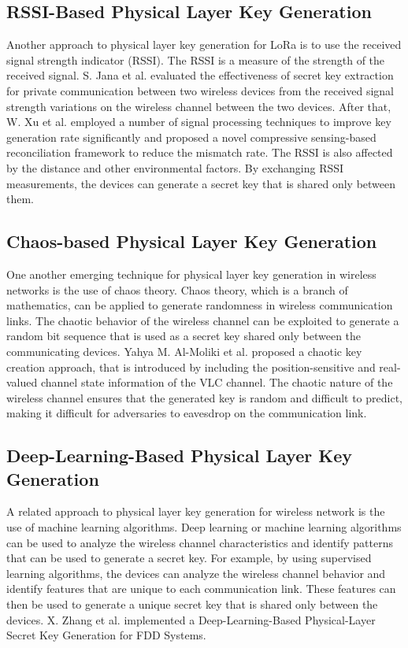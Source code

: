 \subsection{RSSI-Based Physical Layer Key Generation}
Another approach to physical layer key generation for LoRa is to use the received signal strength indicator (RSSI). The RSSI is a measure of the strength of the received signal. S. Jana et al. evaluated the effectiveness of secret key extraction for private communication between two wireless devices from the received signal strength variations on the wireless channel between the two devices\cite{10.1145/1614320.1614356}. After that, W. Xu et al. employed a number of signal processing techniques to improve key generation rate significantly and proposed a novel compressive sensing-based reconciliation framework to reduce the mismatch rate\cite{8580375}. The RSSI is also affected by the distance and other environmental factors. By exchanging RSSI measurements, the devices can generate a secret key that is shared only between them.
\subsection{Chaos-based Physical Layer Key Generation}
One another emerging technique for physical layer key generation in wireless networks is the use of chaos theory. Chaos theory, which is a branch of mathematics, can be applied to generate randomness in wireless communication links. The chaotic behavior of the wireless channel can be exploited to generate a random bit sequence that is used as a secret key shared only between the communicating devices. Yahya M. Al-Moliki et al. proposed a chaotic key creation approach, that is introduced by including the position-sensitive and real-valued channel state information of the VLC channel\cite{https://doi.org/10.1049/iet-opt.2018.5072}. The chaotic nature of the wireless channel ensures that the generated key is random and difficult to predict, making it difficult for adversaries to eavesdrop on the communication link.
\subsection{Deep-Learning-Based Physical Layer Key Generation}
A related approach to physical layer key generation for wireless network is the use of machine learning algorithms. Deep learning or machine learning algorithms can be used to analyze the wireless channel characteristics and identify patterns that can be used to generate a secret key. For example, by using supervised learning algorithms, the devices can analyze the wireless channel behavior and identify features that are unique to each communication link. These features can then be used to generate a unique secret key that is shared only between the devices. X. Zhang et al. implemented a Deep-Learning-Based Physical-Layer Secret Key Generation for FDD Systems\cite{9526766}. 
